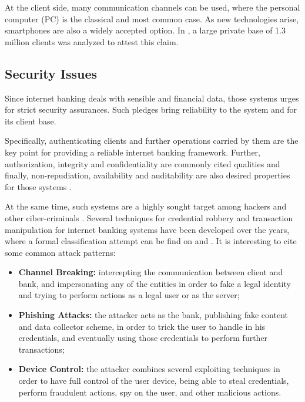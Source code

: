 At the client side, many communication channels can be used, where the personal computer (PC) is the classical and most common case. As new technologies arise, smartphones are also a widely accepted option. In \cite{bbcode-thesis}, a large private base of 1.3 million clients was analyzed to attest this claim.

\subsection{Security Issues}
Since internet banking deals with sensible and financial data, those systems urges for strict security assurances. Such pledges bring reliability to the system and for its client base.

Specifically, authenticating clients and further operations carried by them are the key point for providing a reliable internet banking framework. Further, authorization, integrity and confidentiality are commonly cited qualities and finally, non-repudiation, availability and auditability are also desired properties for those systems \cite{banking-security}.

At the same time, such systems are a highly sought target among hackers and other ciber-criminals \cite{peotta-classification, banking-security}. Several techniques for credential robbery and transaction manipulation for internet banking systems have been developed over the years, where a formal classification attempt can be find on \cite{peotta-classification} and \cite{attacks-on-internet-banking}. It is interesting to cite some common attack patterns:

\begin{itemize}
  \item \textbf{Channel Breaking:} intercepting the communication between client and bank, and impersonating any of the entities in order to fake a legal identity and trying to perform actions as a legal user or as the server;

  \item \textbf{Phishing Attacks:} the attacker acts as the bank, publishing fake content and data collector scheme, in order to trick the user to handle in his credentials, and eventually using those credentials to perform further transactions;

  \item \textbf{Device Control:} the attacker combines several exploiting techniques in order to have full control of the user device, being able to steal credentials, perform fraudulent actions, spy on the user, and other malicious actions.
\end{itemize}

